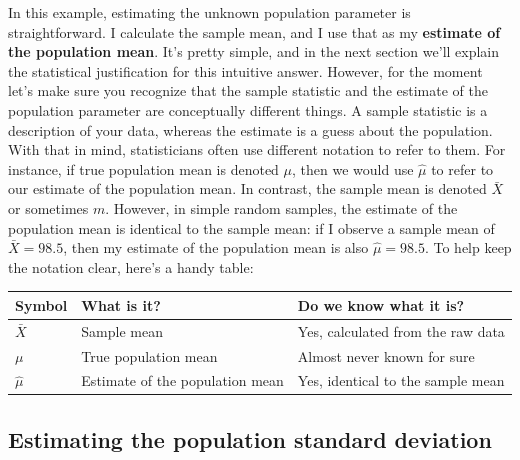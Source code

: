\documentclass[
  letterpaper,
  DIV=11,
  numbers=noendperiod]{scrreprt}
\begin{document}
In this example, estimating the unknown population parameter is
straightforward. I calculate the sample mean, and I use that as my
\textbf{estimate of the population mean}. It's pretty simple, and in the
next section we'll explain the statistical justification for this
intuitive answer. However, for the moment let's make sure you recognize
that the sample statistic and the estimate of the population parameter
are conceptually different things. A sample statistic is a description
of your data, whereas the estimate is a guess about the population. With
that in mind, statisticians often use different notation to refer to
them. For instance, if true population mean is denoted \(\mu\), then we
would use \(\hat\mu\) to refer to our estimate of the population mean.
In contrast, the sample mean is denoted \(\bar{X}\) or sometimes \(m\).
However, in simple random samples, the estimate of the population mean
is identical to the sample mean: if I observe a sample mean of
\(\bar{X} = 98.5\), then my estimate of the population mean is also
\(\hat\mu = 98.5\). To help keep the notation clear, here's a handy
table:

\begin{longtable}[]{@{}
  >{\raggedright\arraybackslash}p{}
  >{\raggedright\arraybackslash}p{}
  >{\raggedright\arraybackslash}p{}@{}}
\toprule\noalign{}
\begin{minipage}[b]{\linewidth}\raggedright
Symbol
\end{minipage} & \begin{minipage}[b]{\linewidth}\raggedright
What is it?
\end{minipage} & \begin{minipage}[b]{\linewidth}\raggedright
Do we know what it is?
\end{minipage} \\
\midrule\noalign{}
\endhead
\bottomrule\noalign{}
\endlastfoot
\(\bar{X}\) & Sample mean & Yes, calculated from the raw data \\
\(\mu\) & True population mean & Almost never known for sure \\
\(\hat{\mu}\) & Estimate of the population mean & Yes, identical to the
sample mean \\
\end{longtable}

\subsection{Estimating the population standard
deviation}\label{estimating-the-population-standard-deviation}
\end{document}
